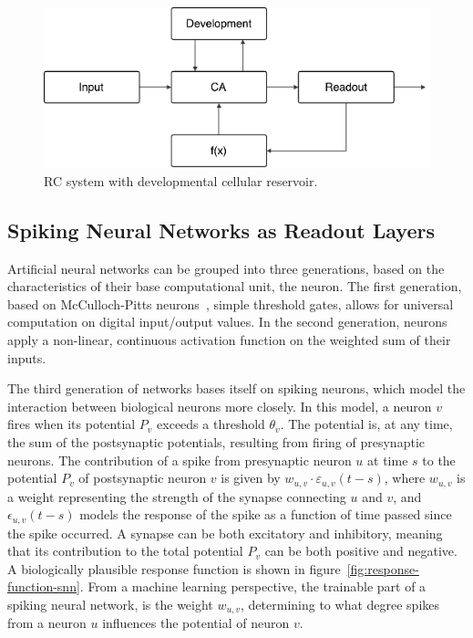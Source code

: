 \begin{figure}[ht]
  \centering
  \includegraphics[width=0.6\linewidth]{fig/rc-dev-ca}
  \caption[RC system with developmental cellular reservoir]{RC system with developmental cellular reservoir.}
  \label{fig:rc-dev-ca}
\end{figure}

\subsection{Spiking Neural Networks as Readout Layers}

Artificial neural networks can be grouped into three generations, based on the
characteristics of their base computational unit, the neuron. The first
generation, based on McCulloch-Pitts neurons~\cite{McCulloch1943}, simple
threshold gates, allows for universal computation on digital input/output
values. In the second generation, neurons apply a non-linear, continuous
activation function on the weighted sum of their inputs.

The third generation of networks bases itself on spiking neurons, which model
the interaction between biological neurons more closely. In this model, a neuron
$v$ fires when its potential $P_v$ exceeds a threshold $\theta_v$. The potential
is, at any time, the sum of the postsynaptic potentials, resulting from firing
of presynaptic neurons. The contribution of a spike from presynaptic neuron $u$
at time $s$ to the potential $P_v$ of postsynaptic neuron $v$ is given by
$w_{u,v} \cdot \varepsilon_{u,v}(t-s)$, where $w_{u,v}$ is a weight representing
the strength of the synapse connecting $u$ and $v$, and $\epsilon_{u,v}(t-s)$
models the response of the spike as a function of time passed since the spike
occurred. A synapse can be both excitatory and inhibitory, meaning that its
contribution to the total potential $P_v$ can be both positive and negative. A
biologically plausible response function is shown in
figure~\ref{fig:response-function-snn}. From a machine learning perspective, the
trainable part of a spiking neural network, is the weight $w_{u,v}$, determining
to what degree spikes from a neuron $u$ influences the potential of neuron $v$.

